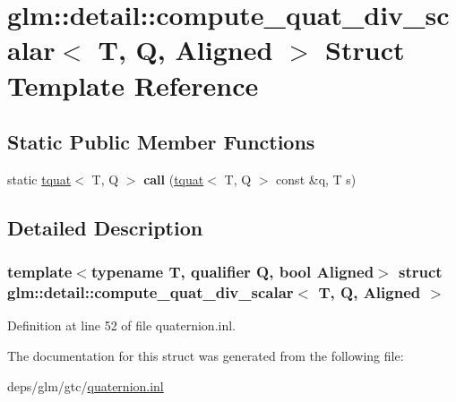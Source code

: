 \hypertarget{structglm_1_1detail_1_1compute__quat__div__scalar}{}\section{glm\+:\+:detail\+:\+:compute\+\_\+quat\+\_\+div\+\_\+scalar$<$ T, Q, Aligned $>$ Struct Template Reference}
\label{structglm_1_1detail_1_1compute__quat__div__scalar}
\subsection*{Static Public Member Functions}
\begin{DoxyCompactItemize}
\item 
\mbox{\label{structglm_1_1detail_1_1compute__quat__div__scalar_a669dfccba8f8cbe2d8309c09b939996e}} 
static \hyperlink{structglm_1_1tquat}{tquat}$<$ T, Q $>$ {\bfseries call} (\hyperlink{structglm_1_1tquat}{tquat}$<$ T, Q $>$ const \&q, T s)
\end{DoxyCompactItemize}


\subsection{Detailed Description}
\subsubsection*{template$<$typename T, qualifier Q, bool Aligned$>$\newline
struct glm\+::detail\+::compute\+\_\+quat\+\_\+div\+\_\+scalar$<$ T, Q, Aligned $>$}



Definition at line 52 of file quaternion.\+inl.



The documentation for this struct was generated from the following file\+:\begin{DoxyCompactItemize}
\item 
deps/glm/gtc/\hyperlink{gtc_2quaternion_8inl}{quaternion.\+inl}\end{DoxyCompactItemize}
